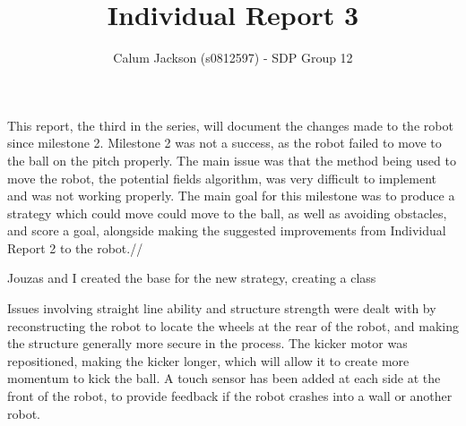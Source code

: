\documentclass[12pt]{article}
\begin{document}
\title{Individual Report 3}
\author{Calum Jackson (s0812597) - 
SDP Group 12}
\maketitle
\begin{flushleft}

This report, the third in the series,  will document the changes made to the robot since milestone 2. Milestone 2 was not a success, as the robot failed to move to the ball on the pitch properly. The main issue was that the method being used to move the robot, the potential fields algorithm, was very difficult to implement and was not working properly. The main goal for this milestone was to produce a strategy which could move could move to the ball, as well as avoiding obstacles, and score a goal, alongside making the suggested improvements from Individual Report 2 to the robot.//

Jouzas and I created the base for the new strategy, creating a class 

Issues involving straight line ability and structure strength were dealt with by reconstructing the robot to locate the wheels at the rear of the robot, and making the structure generally more secure in the process. The kicker motor was repositioned, making the kicker longer, which will allow it to create more momentum to kick the ball. A touch sensor has been added at each side at the front of the robot, to provide feedback if the robot crashes into a wall or another robot.








\end{flushleft}
\end{document}
